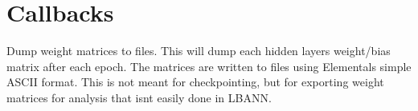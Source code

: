 \hypertarget{group__callbacks}{}\section{Callbacks}
\label{group__callbacks}
Dump weight matrices to files. This will dump each hidden layer\textquotesingle{}s weight/bias matrix after each epoch. The matrices are written to files using Elemental\textquotesingle{}s simple A\+S\+C\+II format. This is not meant for checkpointing, but for exporting weight matrices for analysis that isn\textquotesingle{}t easily done in L\+B\+A\+NN. 